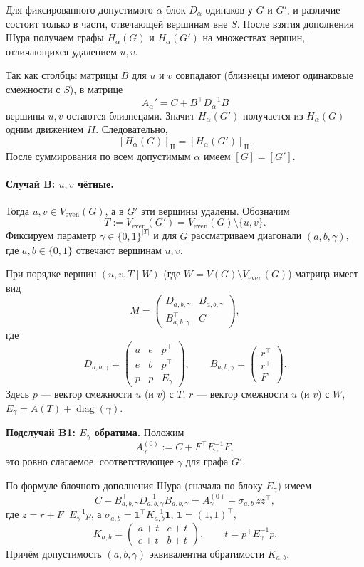 \documentclass[12pt,a4paper]{article}
\begin{document}
Для фиксированного допустимого $\alpha$ блок $D_\alpha$ одинаков у $G$ и $G'$,
и различие состоит только в части, отвечающей вершинам вне $S$.
После взятия дополнения Шура получаем графы $H_\alpha(G)$ и $H_\alpha(G')$ на множествах вершин,
отличающихся удалением $u,v$.

Так как столбцы матрицы $B$ для $u$ и $v$ совпадают (близнецы имеют одинаковые смежности с $S$),
в матрице
\[
A_\alpha'=C+B^\top D_\alpha^{-1}B
\]
вершины $u,v$ остаются близнецами. Значит $H_\alpha(G')$ получается из $H_\alpha(G)$ одним движением $II$.
Следовательно,
\[
[H_\alpha(G)]_{\mathrm{II}}=[H_\alpha(G')]_{\mathrm{II}}.
\]
После суммирования по всем допустимым $\alpha$ имеем $[G]=[G']$.

\paragraph{Случай B: $u,v$ чётные.}
Тогда $u,v\in V_{\mathrm{even}}(G)$, а в $G'$ эти вершины удалены.
Обозначим
\[
T:=V_{\mathrm{even}}(G')=V_{\mathrm{even}}(G)\setminus\{u,v\}.
\]
Фиксируем параметр $\gamma\in\{0,1\}^{|T|}$ и для $G$ рассматриваем диагонали
$(a,b,\gamma)$, где $a,b\in\{0,1\}$ отвечают вершинам $u,v$.

При порядке вершин $(u,v,T\mid W)$ (где $W=V(G)\setminus V_{\mathrm{even}}(G)$)
матрица имеет вид
\[
M=
\begin{pmatrix}
D_{a,b,\gamma} & B_{a,b,\gamma}\\
B_{a,b,\gamma}^\top & C
\end{pmatrix},
\]
где
\[
D_{a,b,\gamma}=
\begin{pmatrix}
a & e & p^\top\\
e & b & p^\top\\
p & p & E_\gamma
\end{pmatrix},
\qquad
B_{a,b,\gamma}=
\begin{pmatrix}
r^\top\\
r^\top\\
F
\end{pmatrix}.
\]
Здесь $p$ --- вектор смежности $u$ (и $v$) с $T$, $r$ --- вектор смежности $u$ (и $v$) с $W$,
$E_\gamma=A(T)+\operatorname{diag}(\gamma)$.

\textbf{Подслучай B1: $E_\gamma$ обратима.}
Положим
\[
A_\gamma^{(0)}:=C+F^\top E_\gamma^{-1}F,
\]
это ровно слагаемое, соответствующее $\gamma$ для графа $G'$.

По формуле блочного дополнения Шура (сначала по блоку $E_\gamma$) имеем
\[
C+B_{a,b,\gamma}^\top D_{a,b,\gamma}^{-1}B_{a,b,\gamma}
=A_\gamma^{(0)}+\sigma_{a,b}\,zz^\top,
\]
где $z=r+F^\top E_\gamma^{-1}p$, а
$\sigma_{a,b}=\mathbf 1^\top K_{a,b}^{-1}\mathbf 1$,
$\mathbf 1=(1,1)^\top$,
\[
K_{a,b}=
\begin{pmatrix}
a+t & e+t\\
e+t & b+t
\end{pmatrix},
\qquad
t=p^\top E_\gamma^{-1}p.
\]
Причём допустимость $(a,b,\gamma)$ эквивалентна обратимости $K_{a,b}$.
\end{document}
